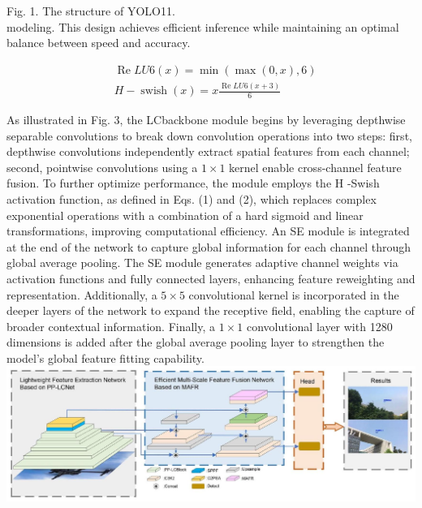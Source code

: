 \documentclass{article}
\begin{document}
Fig. 1. The structure of YOLO11.\\
modeling. This design achieves efficient inference while maintaining an optimal balance between speed and accuracy.


\begin{align*}
& \operatorname{Re} L U 6(x)=\min (\max (0, x), 6)  \tag{1}\\
& H-\operatorname{swish}(x)=x \frac{\operatorname{Re} L U 6(x+3)}{6} \tag{2}
\end{align*}


As illustrated in Fig. 3, the LCbackbone module begins by leveraging depthwise separable convolutions to break down convolution operations into two steps: first, depthwise convolutions independently extract spatial features from each channel; second, pointwise convolutions using a $1 \times 1$ kernel enable cross-channel feature fusion. To further optimize performance, the module employs the H -Swish activation function, as defined in Eqs. (1) and (2), which replaces complex exponential operations with a combination of a hard sigmoid and linear transformations, improving computational efficiency. An SE module is integrated at the end of the network to capture global information for each channel through global average pooling. The SE module generates adaptive channel weights via activation functions and fully connected layers, enhancing feature reweighting and representation. Additionally, a $5 \times 5$ convolutional kernel is incorporated in the deeper layers of the network to expand the receptive field, enabling the capture of broader contextual information. Finally, a $1 \times 1$ convolutional layer with 1280 dimensions is added after the global average pooling layer to strengthen the model's global feature fitting capability.\\
\includegraphics[max width=\textwidth, center]{2025_08_05_34f8389150f57116e76bg-05(1)}
\end{document}
